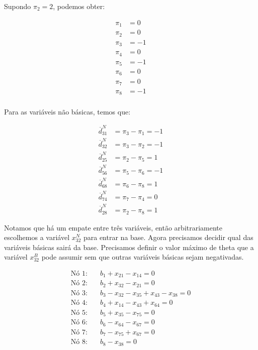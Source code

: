 \documentclass{article}
\begin{document}
Supondo $\pi_{2} = 2$, podemos obter:

\begin{align*}
    \pi_{1} &= 0 \\
    \pi_{2} &= 0 \\
    \pi_{3} &= -1 \\
    \pi_{4} &= 0 \\
    \pi_{5} &= -1 \\
    \pi_{6} &= 0 \\
    \pi_{7} &= 0 \\
    \pi_{8} &= -1 \\
\end{align*}

Para as variáveis não básicas, temos que:

\begin{align*}
    \overline{d}^{N}_{31} &= \pi_{3} - \pi_{1} = -1 \\
    \overline{d}^{N}_{32} &= \pi_{3} - \pi_{2} = -1 \\
    \overline{d}^{N}_{25} &= \pi_{2} - \pi_{5} = 1 \\
    \overline{d}^{N}_{56} &= \pi_{5} - \pi_{6} = -1 \\
    \overline{d}^{N}_{68} &= \pi_{6} - \pi_{8} = 1 \\
    \overline{d}^{N}_{74} &= \pi_{7} - \pi_{4} = 0 \\
    \overline{d}^{N}_{28} &= \pi_{2} - \pi_{8} = 1
\end{align*}

Notamos que há um empate entre três variáveis, então arbitrariamente escolhemos a variável $x^{N}_{32}$ para entrar na base.
Agora precisamos decidir qual das variáveis básicas sairá da base.
Precisamos definir o valor máximo de theta que a variável $x^{B}_{32}$ pode assumir sem que outras variáveis básicas sejam negativadas.

\begin{align}
    \text{Nó 1:} & \quad b_{1} + x_{21} - x_{14} = 0 \\
    \text{Nó 2:} & \quad b_{2} + x_{32} - x_{21} = 0 \\
    \text{Nó 3:} & \quad b_{3} - x_{32} - x_{35} + x_{43} - x_{38} = 0 \\
    \text{Nó 4:} & \quad b_{4} + x_{14} - x_{43} + x_{64} = 0 \\
    \text{Nó 5:} & \quad b_{5} + x_{35} - x_{75} = 0 \\
    \text{Nó 6:} & \quad b_{6} - x_{64} - x_{67} = 0 \\ 
    \text{Nó 7:} & \quad b_{7} - x_{75} + x_{67} = 0 \\
    \text{Nó 8:} & \quad b_{8} - x_{38} = 0
\end{align}
\end{document}
